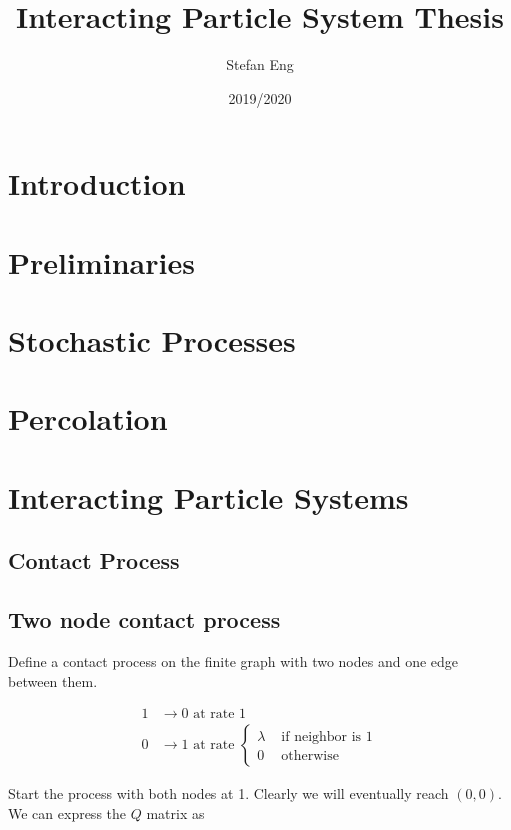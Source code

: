\documentclass{article}
\title{Interacting Particle System Thesis}
\author{Stefan Eng}
\date{2019/2020}
\theoremstyle{plain}
\theoremstyle{definition}
\theoremstyle{remark}
\begin{document}
\maketitle

\section{Introduction}

\section{Preliminaries}

\section{Stochastic Processes}

\section{Percolation}

\section{Interacting Particle Systems}

\subsection{Contact Process}

\subsection{Two node contact process}

Define a contact process on the finite graph with two nodes and one edge between them.

\begin{align}
    1 &\to 0 \text{ at rate } 1\\
    0 &\to 1 \text{ at rate } \begin{cases}
        \lambda & \text{ if neighbor is 1}\\
        0 & \text{ otherwise}
    \end{cases}
\end{align}

Start the process with both nodes at 1.
Clearly we will eventually reach $(0,0)$.
We can express the $Q$ matrix as
\end{document}
